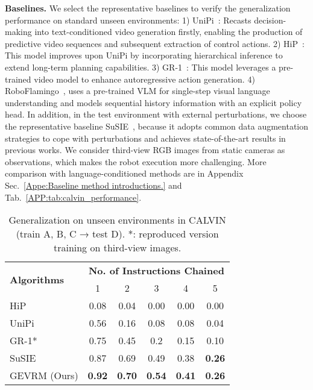 \textbf{Baselines.} We select the representative baselines to verify the generalization performance on standard unseen environments: 
1) UniPi~\citep{du2024learning}: Recasts decision-making into text-conditioned video generation firstly, enabling the production of predictive video sequences and subsequent extraction of control actions.
2) HiP~\citep{ajay2024compositional}: 
This model improves upon UniPi by incorporating hierarchical inference to extend long-term planning capabilities.
3) GR-1~\citep{Wu2023UnleashingLV}:
This model leverages a pre-trained video model to enhance autoregressive action generation.
4) RoboFlamingo~\citep{li2023vision}, uses a pre-trained VLM for single-step visual language understanding and models sequential history information with an explicit policy head.
In addition, in the test environment with external perturbations, we choose the representative baseline SuSIE~\citep{black2023zero}, because it adopts common data augmentation strategies to cope with perturbations and achieves state-of-the-art results in previous works.
We consider third-view RGB images from static cameras as observations, which makes the robot execution more challenging.
More comparison with language-conditioned methods are in Appendix Sec.~\ref{Appe:Baseline method introductions.} and Tab.~\ref{APP:tab:calvin_performance}.
 
\begin{wraptable}{r}{0.6\textwidth}\small
    \centering
    \vspace{-2.em}
    \caption{Generalization on unseen environments in CALVIN (train A, B, C → test D). *: reproduced version training on third-view images.
    }
    \vspace{0.5em}
    \begin{tabular}{lccccc}
        \toprule
        \multirow{2}{*}{\textbf{Algorithms}} & \multicolumn{5}{c}{\textbf{No. of Instructions Chained}} \\
        \cmidrule(lr){2-6}
        & 1 & 2 & 3 & 4 & 5 \\
        \midrule
        HiP & 0.08 & 0.04 & 0.00 & 0.00 & 0.00 \\
        UniPi & 0.56 & 0.16 & 0.08 & 0.08 & 0.04 \\
        GR-1* & 0.75 & 0.45 & 0.2 & 0.15 & 0.10 \\
        SuSIE & 0.87 & 0.69 & 0.49 & 0.38 & \textbf{0.26} \\
        \midrule
        GEVRM (Ours) & \textbf{0.92} & \textbf{0.70} & \textbf{0.54} & \textbf{0.41} & \textbf{0.26} \\
        \bottomrule
    \end{tabular}
    \label{tab:calvin_performance}
\end{wraptable}

